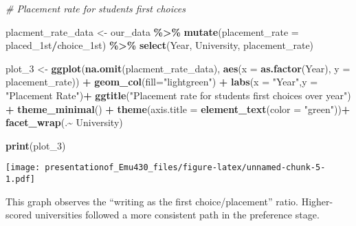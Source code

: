 \documentclass[
]{article}
\newenvironment{Shaded}{\begin{snugshade}}{\end{snugshade}}
\newcommand{\AttributeTok}[1]{\textcolor[rgb]{0.13,0.29,0.53}{#1}}
\newcommand{\CommentTok}[1]{\textcolor[rgb]{0.56,0.35,0.01}{\textit{#1}}}
\newcommand{\FunctionTok}[1]{\textcolor[rgb]{0.13,0.29,0.53}{\textbf{#1}}}
\newcommand{\NormalTok}[1]{#1}
\newcommand{\OtherTok}[1]{\textcolor[rgb]{0.56,0.35,0.01}{#1}}
\newcommand{\SpecialCharTok}[1]{\textcolor[rgb]{0.81,0.36,0.00}{\textbf{#1}}}
\newcommand{\StringTok}[1]{\textcolor[rgb]{0.31,0.60,0.02}{#1}}
\begin{document}
\begin{Shaded}
\begin{Highlighting}[]
\CommentTok{\# Placement rate for students\textquotesingle{} first choices}


\NormalTok{placment\_rate\_data }\OtherTok{\textless{}{-}}\NormalTok{ our\_data }\SpecialCharTok{\%\textgreater{}\%} \FunctionTok{mutate}\NormalTok{(}\AttributeTok{placement\_rate =}\NormalTok{ placed\_1st}\SpecialCharTok{/}\NormalTok{choice\_1st) }\SpecialCharTok{\%\textgreater{}\%} \FunctionTok{select}\NormalTok{(Year, University, placement\_rate)}

\NormalTok{plot\_3 }\OtherTok{\textless{}{-}} \FunctionTok{ggplot}\NormalTok{(}\FunctionTok{na.omit}\NormalTok{(placment\_rate\_data), }\FunctionTok{aes}\NormalTok{(}\AttributeTok{x =} \FunctionTok{as.factor}\NormalTok{(Year), }\AttributeTok{y =}\NormalTok{ placement\_rate)) }\SpecialCharTok{+}
  \FunctionTok{geom\_col}\NormalTok{(}\AttributeTok{fill=}\StringTok{"lightgreen"}\NormalTok{) }\SpecialCharTok{+}
  \FunctionTok{labs}\NormalTok{(}\AttributeTok{x =} \StringTok{"Year"}\NormalTok{,}\AttributeTok{y =} \StringTok{"Placement Rate"}\NormalTok{)}\SpecialCharTok{+}
  \FunctionTok{ggtitle}\NormalTok{(}\StringTok{"Placement rate for students\textquotesingle{} first choices over year"}\NormalTok{) }\SpecialCharTok{+}
  \FunctionTok{theme\_minimal}\NormalTok{() }\SpecialCharTok{+}
  \FunctionTok{theme}\NormalTok{(}\AttributeTok{axis.title =} \FunctionTok{element\_text}\NormalTok{(}\AttributeTok{color =} \StringTok{"green"}\NormalTok{))}\SpecialCharTok{+}
  \FunctionTok{facet\_wrap}\NormalTok{(.}\SpecialCharTok{\textasciitilde{}}\NormalTok{ University)}

\FunctionTok{print}\NormalTok{(plot\_3)}
\end{Highlighting}
\end{Shaded}

\texttt{[image: presentationof\_Emu430\_files/figure-latex/unnamed-chunk-5-1.pdf]}

This graph observes the ``writing as the first choice/placement'' ratio.
Higher-scored universities followed a more consistent path in the
preference stage.
\end{document}
